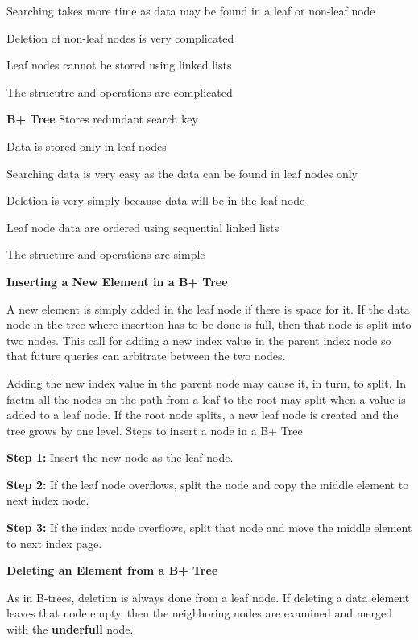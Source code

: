 \vskip 3mm
  Searching takes more time as data may be found in a leaf or non-leaf node

\vskip 3mm
 Deletion of non-leaf nodes is very complicated

\vskip 3mm
 Leaf nodes cannot be stored using linked lists

\vskip 3mm
 The strucutre and operations are complicated

\vskip 3mm
{\bf B+ Tree}
\vskip 1mm
 Stores redundant search key

\vskip 3mm
 Data is stored only in leaf nodes

\vskip 3mm
 Searching data is very easy as the data can be found in leaf nodes only

\vskip 3mm
 Deletion is very simply because data will be in the leaf node

\vskip 3mm
 Leaf node data are ordered using sequential linked lists

\vskip 3mm
 The structure and operations are simple

\filbreak
\vskip 1cm
{\bf Inserting a New Element in a B+ Tree}

\vskip 1mm
A new element is simply added in the leaf node if there is space for it. If the data node in the tree where insertion has to be done is full, then that node is split into two nodes. This call for adding a new index value in the parent index node so that future queries can arbitrate between the two nodes.

\vskip 1mm
Adding the new index value in the parent node may cause it, in turn, to split. In factm all the nodes on the path from a leaf to the root may split when a value is added to a leaf node. If the root node splits, a new leaf node is created and the tree grows by one level. Steps to insert a node in a B+ Tree

\vskip 1mm
{\bf Step 1:} Insert the new node as the leaf node.

\vskip 3mm
{\bf Step 2:} If the leaf node overflows, split the node and copy the middle element to next index node.

\vskip 3mm
{\bf Step 3:} If the index node overflows, split that node and move the middle element to next index page.

\filbreak
\vskip 1cm
{\bf Deleting an Element from a B+ Tree}

\vskip 1mm
As in B-trees, deletion is always done from a leaf node. If deleting a data element leaves that node empty, then the neighboring nodes are examined and merged with the {\bf underfull} node.

